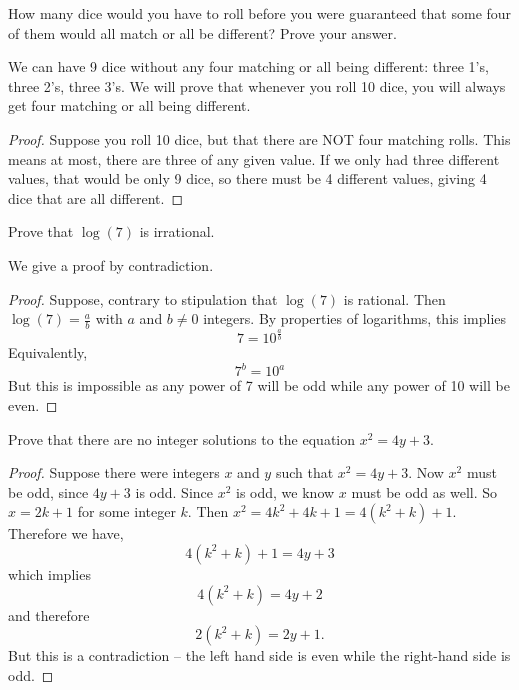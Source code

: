 \begin{questions}
\question How many dice would you have to roll before you were guaranteed that some four of them would all match or all be different?  Prove your answer.

	\begin{answer}
		We can have 9 dice without any four matching or all being different: three 1's, three 2's, three 3's.  We will prove that whenever you roll 10 dice, you will always get four matching or all being different.
		\begin{proof}
			Suppose you roll 10 dice, but that there are NOT four matching rolls.  This means at most, there are three of any given value.  If we only had three different values, that would be only 9 dice, so there must be 4 different values, giving 4 dice that are all different.
		\end{proof} 
	\end{answer}
	




\question Prove that $\log(7)$ is irrational.

	\begin{answer}
	 We give a proof by contradiction.
	\begin{proof}
	  Suppose, contrary to stipulation that $\log(7)$ is rational.  Then $\log(7) = \frac{a}{b}$ with $a$ and $b \ne 0$ integers.  By properties of logarithms, this implies
	  \[7 = 10^{\frac{a}{b}}\]
	  Equivalently,
	  \[7^b = 10^a\]
	  But this is impossible as any power of 7 will be odd while any power of 10 will be even.
	\end{proof}
	\end{answer}


\question Prove that there are no integer solutions to the equation $x^2 = 4y + 3$.

	\begin{answer}
		\begin{proof}
		  Suppose there were integers $x$ and $y$ such that $x^2 = 4y + 3$.  Now $x^2$ must be odd, since $4y + 3$ is odd.  Since $x^2$ is odd, we know $x$ must be odd as well.  So $x = 2k + 1$ for some integer $k$.  Then $x^2 = 4k^2 + 4k + 1 = 4(k^2 + k) + 1$.  Therefore we have,
		  \[4(k^2 + k) + 1 = 4y + 3\]
		  which implies
		  \[4(k^2 + k) = 4y + 2\]
		  and therefore
		  \[2(k^2 + k) = 2y + 1.\]
		  But this is a contradiction -- the left hand side is even while the right-hand side is odd. 
		\end{proof}
		
	\end{answer}
 


\end{questions}

